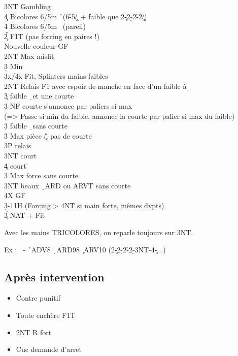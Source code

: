 \documentclass[a4paper]{article}
\begin{document}
\begin{bidtable}
3NT \> Gambling \c \\
4\c\d \> Bicolores 6/5m \h\ (6\h -5\c /\d\ + faible que 2\c -2\d -2\h -2\c /\d )\\
4\h\s \> Bicolores 6/5m \s\ (pareil)\-\\
2\h{}\c \> F1T (pas forcing en paires !)\\
\>Nouvelle couleur GF\+\\
2NT \> Max misfit\\
3\d \> Min\\
3x/4x \> Fit, Splinters mains faibles\-\\
2NT \> Relais F1 avec espoir de manche en face d’un faible à \d \+\\
3\c \> faible \d\ et une courte\+\\
3\d \> NF courte s’annonce par paliers si max\\
\>(=> Passe si min du faible, annonce la courte par palier si max du faible)\-\\
3\d \> faible \d\ sans courte\\
3\h \> Max pièce \c /\h , pas de courte\+\\
3P \> relais\+\\
3NT \> court \c \\
4\c \> court \h \-\-\\
3\s \> Max force sans courte\\
3NT \> beaux \d\ ARD ou ARVT sans courte\\
4X \> GF\-\\
3\d {}-11H (Forcing > 4NT si main forte, mêmes dvpts)\\
3\h{}\c \> NAT + Fit\-
\end{bidtable}

Avec les mains TRICOLORES, on reparle toujours sur 3NT.

Ex : \s\ - \h\ ADV8 \d\ ARD98 \c\ ARV10
(2\c -2\d -2\h -2\d -3NT-4\c -...)

\subsection{Après intervention}

\begin{itemize}
\item Contre punitif

\item Toute enchère F1T

\item 2NT R fort

\item Cue demande d'arret

\end{itemize}
\end{document}
